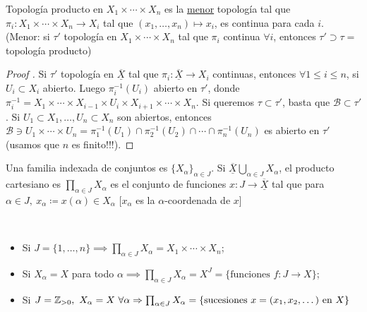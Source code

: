 \begin{lemma}
	Topología producto en $X_1 \times \cdots \times X_n$ es la \underline{menor} topología tal que $\pi_i :X_1 \times \cdots \times X_n \to X_i$ tal que $(x_1,\dots,x_n) \mapsto x_i$, es continua para cada $i$. \\
	(Menor: si $\tau'$ topología en $X_1\times\cdots\times X_n$ tal que $\pi_i$ continua $\forall i$, entonces $\tau' \supset \tau=$topología producto)
\end{lemma}
\begin{proof}[Proof ]
	Si $\tau'$ topología en $\underline{\overline{X}}$ tal que $\pi_i : \underline{\overline{X}} \to X_i$ continuas, entonces $\forall 1 \leq i \leq n$, si $U_i \subset X_i$ abierto. Luego $\pi_i^{-1}(U_i)$ abierto en $\tau'$, donde $\pi_i^{-1} = X_1 \times \cdots \times X_{i-1} \times U_i \times X_{i+1} \times \cdots \times X_n$. Si queremos $\tau \subset \tau'$, basta que $\mathcal{B} \subset \tau'$. Si $U_1 \subset X_1, \dots, U_n\subset X_n$ son abiertos, entonces $\mathcal{B} \ni U_1 \times \cdots \times U_n = \pi_{1}^{-1}(U_1) \cap \pi_{2}^{-1}(U_2) \cap \cdots \cap \pi_{n}^{-1}(U_n)$ es abierto en $\tau'$ (usamos que $n$ es finito!!!).
\end{proof}

\begin{definition}[producto]
	Una familia indexada de conjuntos es $\{ X_{\alpha} \}_{\alpha\in J}$. Si $\underline{\overline{X}} \bigcup_{\alpha\in J} X_{\alpha}$, el producto cartesiano es $\prod_{\alpha\in J} X_{\alpha}$ es el conjunto de funciones $x : J \to \underline{\overline{X}}$ tal que para $\alpha \in J,\ x_{\alpha} \coloneq x(\alpha) \in X_{\alpha}$ [$x_{\alpha}$ es la $\alpha$-coordenada de $x$]
\end{definition}

\begin{eg}~
	\begin{itemize}
		\item Si $J = \{1,\dots,n\} \implies \prod_{\alpha\in J} X_{\alpha} = X_1 \times \cdots \times X_n$;

		\item Si $X_{\alpha} = X$ para todo $\alpha \implies \prod_{\alpha \in J} X_{\alpha} = X^J = \{ \text{funciones } f:J\to X\}$;

		\item Si $J= \Z_{>0},\ X_{\alpha}=X\ \forall \alpha \implies \prod_{\alpha\in J} X_{\alpha} = \{\text{sucesiones } x=(x_1,x_2,\dots) \text{ en } X \}$ 
	\end{itemize}
\end{eg}

